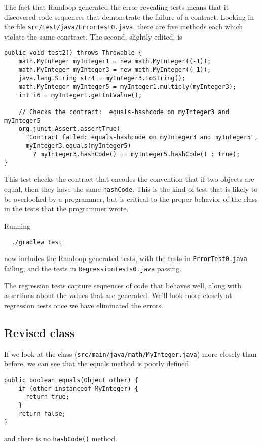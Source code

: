 \documentclass[11pt, oneside]{article} %
\newcommand{\code}[1]{{\texttt{#1}}}
\begin{document}
The fact that Randoop generated the error-revealing tests means that it discovered code sequences that demonstrate the failure of a contract.
Looking in the file \texttt{src/test/java/ErrorTest0.java}, there are five methods each which violate the same constract.
The second, slightly edited, is
\begin{verbatim}
public void test2() throws Throwable {
    math.MyInteger myInteger1 = new math.MyInteger((-1));
    math.MyInteger myInteger3 = new math.MyInteger((-1));
    java.lang.String str4 = myInteger3.toString();
    math.MyInteger myInteger5 = myInteger1.multiply(myInteger3);
    int i6 = myInteger1.getIntValue();
    
    // Checks the contract:  equals-hashcode on myInteger3 and myInteger5
    org.junit.Assert.assertTrue(
      "Contract failed: equals-hashcode on myInteger3 and myInteger5",
      myInteger3.equals(myInteger5) 
        ? myInteger3.hashCode() == myInteger5.hashCode() : true);
}
\end{verbatim}
This test checks the contract that encodes the convention that if two objects are equal, then they have the same \code{hashCode}.
This is the kind of test that is likely to be overlooked by a programmer, but is critical to the proper behavior of the class in the tests that the programmer wrote.

Running 
\begin{verbatim}
  ./gradlew test
\end{verbatim}
now includes the Randoop generated tests, with the tests in \texttt{ErrorTest0.java} failing, and the tests in \texttt{RegressionTests0.java} passing.


The regression tests capture sequences of code that behaves well, along with assertions about the values that are generated. 
We'll look more closely at regression tests once we have eliminated the errors.

\subsection{Revised class}

If we look at the class (\texttt{src/main/java/math/MyInteger.java}) more closely than before, we can see that the equals method is poorly defined
\begin{verbatim}
public boolean equals(Object other) {
    if (other instanceof MyInteger) {
      return true;
    }
    return false;
}
\end{verbatim}
and there is no \code{hashCode()} method.
\end{document}
